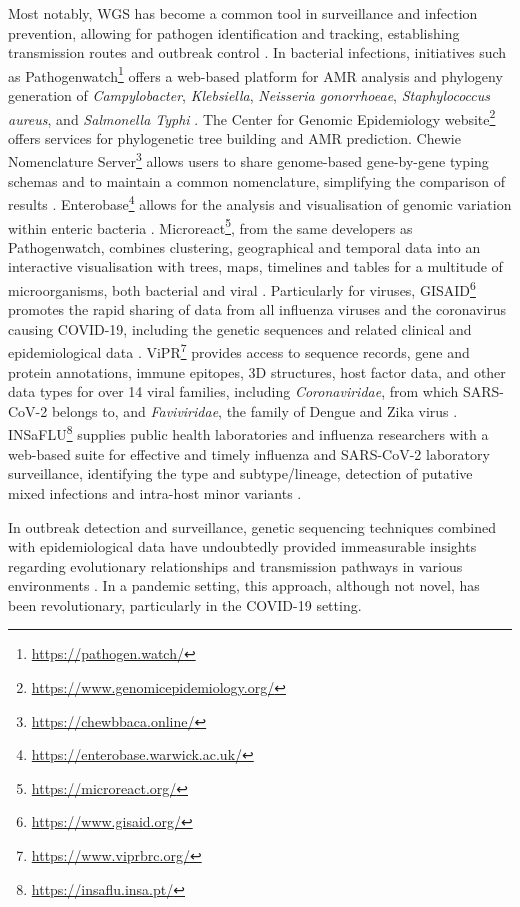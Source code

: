Most notably, \ac{WGS} has become a common tool in surveillance and infection prevention, allowing for pathogen identification and tracking, establishing transmission routes and outbreak control \citep{lo_genomics_2020}. 
In bacterial infections, initiatives such as Pathogenwatch\footnote{\url{https://pathogen.watch/}} offers a web-based platform for \ac{AMR} analysis and phylogeny generation of \textit{Campylobacter}, \textit{Klebsiella}, \textit{Neisseria gonorrhoeae}, \textit{Staphylococcus aureus}, and \textit{Salmonella Typhi} \citep{afolayan_overcoming_2021}. 
The Center for Genomic Epidemiology website\footnote{\url{https://www.genomicepidemiology.org/}} offers services for phylogenetic tree building and \ac{AMR} prediction. 
Chewie Nomenclature Server\footnote{\url{https://chewbbaca.online/}} allows users to share genome-based gene-by-gene typing schemas and to maintain a common nomenclature, simplifying the comparison of results \citep{mamede_chewie_2021}. 
Enterobase\footnote{\url{https://enterobase.warwick.ac.uk/}} allows for the analysis and visualisation of genomic variation within enteric bacteria \citep{zhou_enterobase_2020}. 
Microreact\footnote{\url{https://microreact.org/}}, from the same developers as Pathogenwatch, combines clustering, geographical and temporal data into an interactive visualisation with trees, maps, timelines and tables for a multitude of microorganisms, both bacterial and viral \citep{argimon_microreact_nodate}. 
Particularly for viruses, GISAID\footnote{\url{https://www.gisaid.org/}}  promotes the rapid sharing of data from all influenza viruses and the coronavirus causing COVID-19, including the genetic sequences and related clinical and epidemiological data \citep{shu_gisaid_2017}. 
ViPR\footnote{\url{https://www.viprbrc.org/}} provides access to sequence records, gene and protein annotations, immune epitopes, 3D structures, host factor data, and other data types for over 14 viral families, including \textit{Coronaviridae}, from which \ac{SARS-CoV-2} belongs to, and \textit{Faviviridae}, the family of Dengue and Zika virus \citep{pickett_virus_2012}. 
INSaFLU\footnote{\url{https://insaflu.insa.pt/}} supplies public health laboratories and influenza researchers with a web-based suite for effective and timely influenza and \ac{SARS-CoV-2} laboratory surveillance, identifying the type and subtype/lineage, detection of putative mixed infections and intra-host minor variants \citep{borges_insaflu_2018}. 

In outbreak detection and surveillance, genetic sequencing techniques combined with epidemiological data have undoubtedly provided immeasurable insights regarding evolutionary relationships and transmission pathways in various environments \citep{beckett_pandemic_2021, lancet_genomic_2021}. 
In a pandemic setting, this approach, although not novel, has been revolutionary, particularly in the COVID-19 setting. 

